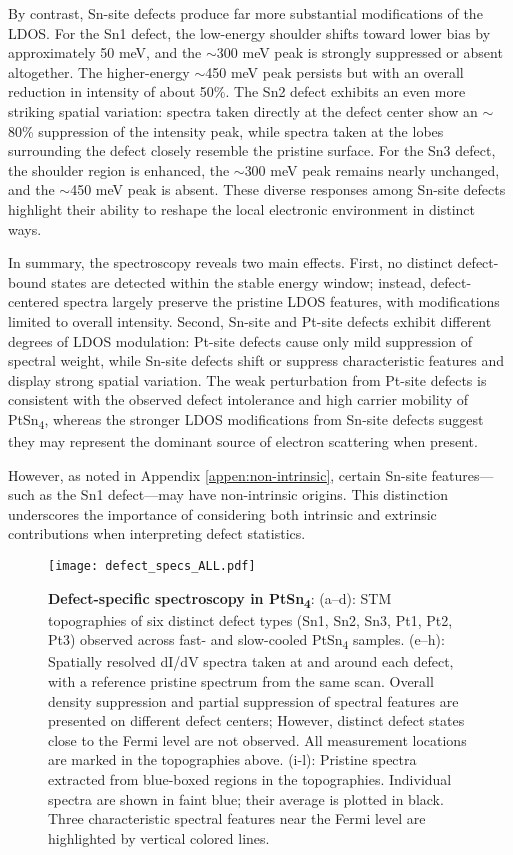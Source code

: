 By contrast, Sn-site defects produce far more substantial modifications of the LDOS. For the Sn1 defect, the low-energy shoulder shifts toward lower bias by approximately 50 meV, and the $\sim$300 meV peak is strongly suppressed or absent altogether. The higher-energy $\sim$450 meV peak persists but with an overall reduction in intensity of about 50\%. The Sn2 defect exhibits an even more striking spatial variation: spectra taken directly at the defect center show an $\sim$80\% suppression of the intensity peak, while spectra taken at the lobes surrounding the defect closely resemble the pristine surface. For the Sn3 defect, the shoulder region is enhanced, the $\sim$300 meV peak remains nearly unchanged, and the $\sim$450 meV peak is absent. These diverse responses among Sn-site defects highlight their ability to reshape the local electronic environment in distinct ways.

In summary, the spectroscopy reveals two main effects. First, no distinct defect-bound states are detected within the stable energy window; instead, defect-centered spectra largely preserve the pristine LDOS features, with modifications limited to overall intensity. Second, Sn-site and Pt-site defects exhibit different degrees of LDOS modulation: Pt-site defects cause only mild suppression of spectral weight, while Sn-site defects shift or suppress characteristic features and display strong spatial variation. The weak perturbation from Pt-site defects is consistent with the observed defect intolerance and high carrier mobility of PtSn\textsubscript{4}, whereas the stronger LDOS modifications from Sn-site defects suggest they may represent the dominant source of electron scattering when present.

However, as noted in Appendix \ref{appen:non-intrinsic}, certain Sn-site features—such as the Sn1 defect—may have non-intrinsic origins. This distinction underscores the importance of considering both intrinsic and extrinsic contributions when interpreting defect statistics.

\begin{figure}
	\centering
	\texttt{[image: defect\_specs\_ALL.pdf]}
	\caption[\textbf{Defect-specific spectroscopy in PtSn\textsubscript{4}}]{\textbf{Defect-specific spectroscopy in PtSn\textsubscript{4}}:
		(a–d): STM topographies of six distinct defect types (Sn1, Sn2, Sn3, Pt1, Pt2, Pt3) observed across fast- and slow-cooled PtSn\textsubscript{4} samples.
		(e–h): Spatially resolved dI/dV spectra taken at and around each defect, with a reference pristine spectrum from the same scan. Overall density suppression and partial suppression of spectral features are presented on different defect centers; However, distinct defect states close to the Fermi level are not observed. All measurement locations are marked in the topographies above.
		(i-l): Pristine spectra extracted from blue-boxed regions in the topographies. Individual spectra are shown in faint blue; their average is plotted in black. Three characteristic spectral features near the Fermi level are highlighted by vertical colored lines.}
	\label{fig:defect_spectro}
\end{figure}
